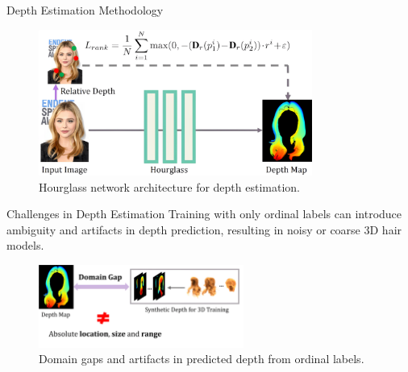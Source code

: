 \begin{frame}{Depth Estimation Methodology}
    \begin{figure}[h]
        \centering
        \includegraphics[width=0.8\textwidth]{assets/figures/method/depth/hourglass.png}
        \caption{Hourglass network architecture for depth estimation.}
        \label{fig:hourglass_depth}
    \end{figure}
\end{frame}

\begin{frame}[t]{Challenges in Depth Estimation}
    Training with only ordinal labels can introduce ambiguity and artifacts in depth prediction, resulting in noisy or coarse 3D hair models.

    \vspace{5pt}

    \begin{figure}[t]
        \centering
        \includegraphics[width=0.6\textwidth]{assets/figures/method/depth/domain-gap.png}
        \caption{Domain gaps and artifacts in predicted depth from ordinal labels.}
        \label{fig:domain_gap}
    \end{figure}
\end{frame}

